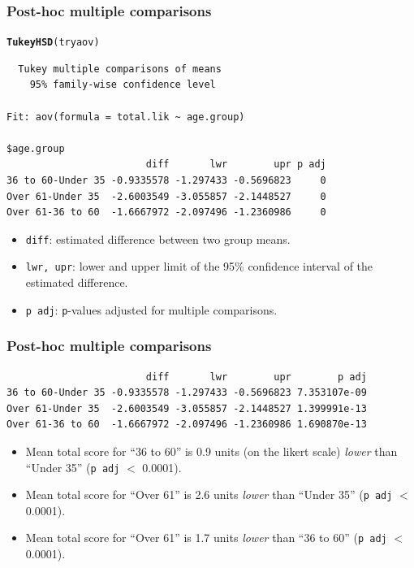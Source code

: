 \documentclass{beamer}\usepackage[]{graphicx}\usepackage[]{color}
\makeatletter
\newcommand{\hlstd}[1]{\textcolor[rgb]{0.345,0.345,0.345}{#1}}%
\newcommand{\hlkwd}[1]{\textcolor[rgb]{0.737,0.353,0.396}{\textbf{#1}}}%
\newenvironment{kframe}{%
 \def\at@end@of@kframe{}%
 \ifinner\ifhmode%
  \def\at@end@of@kframe{\end{minipage}}%
  \begin{minipage}{\columnwidth}%
 \fi\fi%
 \def\FrameCommand##1{\hskip\@totalleftmargin \hskip-\fboxsep
 \colorbox{shadecolor}{##1}\hskip-\fboxsep
     \hskip-\linewidth \hskip-\@totalleftmargin \hskip\columnwidth}%
 \MakeFramed {\advance\hsize-\width
   \@totalleftmargin\z@ \linewidth\hsize
   \@setminipage}}%
 {\par\unskip\endMakeFramed%
 \at@end@of@kframe}
\newenvironment{knitrout}{}{} %
\makeatother
\begin{document}
\begin{frame}[fragile]
\frametitle{Post-hoc multiple comparisons}
\begin{knitrout}\small
{}\color{fgcolor}\begin{kframe}
\begin{alltt}
\hlkwd{TukeyHSD}\hlstd{(tryaov)}
\end{alltt}
\begin{verbatim}
  Tukey multiple comparisons of means
    95% family-wise confidence level

Fit: aov(formula = total.lik ~ age.group)

$age.group
                        diff       lwr        upr p adj
36 to 60-Under 35 -0.9335578 -1.297433 -0.5696823     0
Over 61-Under 35  -2.6003549 -3.055857 -2.1448527     0
Over 61-36 to 60  -1.6667972 -2.097496 -1.2360986     0
\end{verbatim}
\end{kframe}
\end{knitrout}
\begin{itemize}
\item \texttt{diff}: estimated difference between two group means.
\item \texttt{lwr, upr}: lower and upper limit of the 95\% confidence interval of the estimated difference.
\item \texttt{p adj}: \texttt{p}-values adjusted for multiple comparisons.
\end{itemize}
\end{frame}


\begin{frame}[fragile]
\frametitle{Post-hoc multiple comparisons}
\begin{knitrout}\small
{}\color{fgcolor}\begin{kframe}
\begin{verbatim}
                        diff       lwr        upr        p adj
36 to 60-Under 35 -0.9335578 -1.297433 -0.5696823 7.353107e-09
Over 61-Under 35  -2.6003549 -3.055857 -2.1448527 1.399991e-13
Over 61-36 to 60  -1.6667972 -2.097496 -1.2360986 1.690870e-13
\end{verbatim}
\end{kframe}
\end{knitrout}
\begin{itemize}
\item Mean total score for ``36 to 60'' is 0.9 units (on the likert scale) \emph{lower} than ``Under 35'' (\texttt{p adj} $<$ 0.0001).
\item Mean total score for ``Over 61'' is 2.6 units \emph{lower} than ``Under 35'' (\texttt{p adj} $<$ 0.0001).
\item Mean total score for ``Over 61'' is 1.7 units \emph{lower} than ``36 to 60'' (\texttt{p adj} $<$ 0.0001).
\end{itemize}
\end{frame}
 
\end{document}
